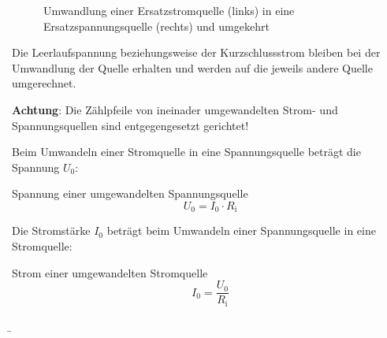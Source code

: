\begin{frame}
{\begin{figure}[h!]
\begin{center}

	\end{center}
	\label{fig:umwandlung}
	\caption{Umwandlung einer Ersatzstromquelle (links) in eine Ersatzspannungsquelle (rechts) und umgekehrt}	
	\end{figure}


	Die Leerlaufspannung beziehungsweise der Kurzschlussstrom bleiben bei der Umwandlung der Quelle erhalten
	und werden auf die jeweils andere Quelle umgerechnet.

	\textbf{Achtung}: Die Zählpfeile von ineinader umgewandelten Strom- und Spannungsquellen sind entgegengesetzt gerichtet!


	Beim Umwandeln einer Stromquelle in eine Spannungsquelle beträgt die Spannung $U_0$:

	\begin{Merksatz}{Spannung einer umgewandelten Spannungsquelle}{}
		\begin{equation*}
			U_0 = I_0 \cdot R_\mathrm{i}
		\end{equation*}
		
	\end{Merksatz}

	Die Stromstärke $I_0$ beträgt beim Umwandeln einer Spannungsquelle in eine Stromquelle:

	\begin{Merksatz}{Strom einer umgewandelten Stromquelle}{}
		\begin{equation*}
			I_0 = \frac{U_0}{R_\mathrm{i}} 
		\end{equation*}
		
	\end{Merksatz}






	}




	
	\b{


	\begin{columns}


\end{columns}}
\end{frame}
